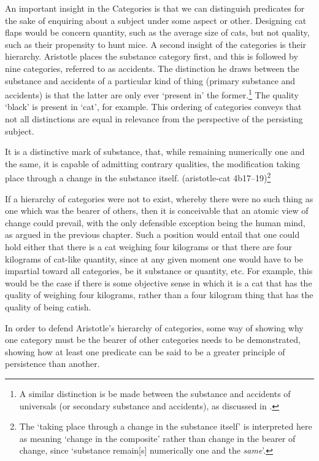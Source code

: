 An important insight in the Categories is that we can distinguish predicates for the sake of enquiring about a subject under some aspect or other.
Designing cat flaps would be concern quantity, such as the average size of cats, but not quality, such as their propensity to hunt mice. A second insight of the categories is their hierarchy. Aristotle places the substance category first, and this is followed by nine categories, referred to as accidents. The distinction he draws between the substance and accidents of a particular kind of thing (primary substance and accidents) is that the latter are only ever `present in' the former.\footnote{A similar distinction is be made between the substance and accidents of universals (or secondary substance and accidents), as discussed in \textcite[][]{sep-aristotle-categories}.} The quality `black' is present in `cat', for example.  This ordering of categories conveys that not all distinctions are equal in relevance from the perspective of the persisting subject.
\begin{quoting}
It is a distinctive mark of substance, that, while remaining numerically one and the same, it is capable of admitting contrary qualities, the modification taking place through a change in the substance itself. (\acrshort{aristotle-cat} 4b17--19)\footnote{The `taking place through a change in the substance itself' is interpreted here as meaning `change in the composite' rather than change in the bearer of change, since `substance remain[s] numerically one and the \emph{same}'.}
\end{quoting}

If a hierarchy of categories were not to exist, whereby there were no such thing as one which was the bearer of others, then it is conceivable that an atomic view of change could prevail, with the only defensible exception being the human mind, as argued in the previous chapter. Such a position would entail that one could hold either that there is a cat weighing four kilograms or that there are four kilograms of cat-like quantity, since at any given moment one would have to be impartial toward all categories, be it substance or quantity, etc. For example, this would be the case if there is some objective sense in which it is a cat that has the quality of weighing four kilograms, rather than a four kilogram thing that has the quality of being catish.

In order to defend Aristotle's hierarchy of categories, some way of showing why one category must be the bearer of other categories needs to be demonstrated, showing how at least one predicate can be said to be a greater principle of persistence than another.

